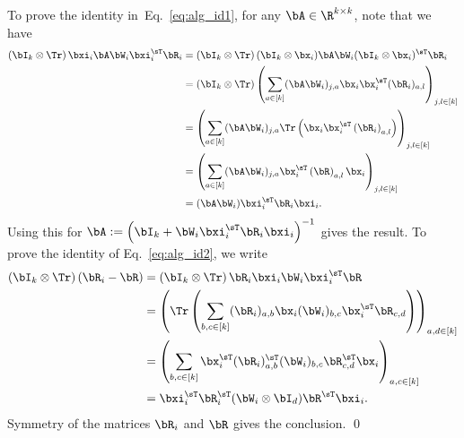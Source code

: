 To prove the identity in~Eq.~\eqref{eq:alg_id1},
for any $\bA \in\R^{k\times k}$, note that 
we have
\begin{align*}
\left(\bI_k \otimes \Tr\right) \bxi_i \bA  \bW_i\bxi_i^\sT \bR_i
   &=\left(\bI_k \otimes \Tr\right) (\bI_k \otimes \bx_i)
   \bA  
\bW_i
   (\bI_k \otimes \bx_i)^\sT \bR_i\\
   &= \left(\bI_k \otimes \Tr\right) \left(\sum_{a\in[k]} 
   (\bA \bW_i)_{j,a}
   \bx_i\bx_i^\sT  (\bR_i)_{a,l}
   \right)_{j,l \in[k]}
   \\
   &= \left( \sum_{a \in [k]}
   (\bA \bW_i)_{j,a}
   \Tr\left(\bx_i\bx_i^\sT  \left(\bR_i\right)_{a,l}
   \right)\right)_{j,l \in [k]}\\
   &= \left( \sum_{a \in [k]}
   (\bA \bW_i)_{j,a}
   \bx_i^\sT  \left(\bR\right)_{a,l} \bx_i
   \right)_{j,l \in [k]}\\
   &= 
   (\bA \bW_i)
   \bxi_i^\sT \bR_i\bxi_i.
\end{align*}
Using this for 
    $\bA :=\left( \bI_k + \bW_i\bxi_i^\sT \bR_i \bxi_i\right)^{-1}$
gives the result.
To prove the identity of Eq.~\eqref{eq:alg_id2}, we write
\begin{align*}
   \left(\bI_k \otimes \Tr \right)(\bR_i - \bR) &= \left(\bI_k \otimes \Tr \right)\bR_i \bxi_i \bW_i\bxi_i^\sT \bR\\
   &= \left(\Tr\left( \sum_{b,c \in [k]} (\bR_i)_{a,b} \bx_i(\bW_i)_{b,c}\bx_i^\sT \bR_{c,d}\right)  \right)_{a,d \in [k]}\\
   &= \left( \sum_{b,c \in [k]}  \bx_i^\sT  (\bR_i)_{a,b}^\sT (\bW_i)_{b,c}\bR_{c,d}^\sT \bx_i  \right)_{a,c \in [k]}\\
   &=  \bxi_i^\sT \bR_i^\sT (\bW_i \otimes \bI_d) \bR^\sT \bxi_i.
\end{align*}
Symmetry of the matrices $\bR_i$ and $\bR$ gives the conclusion.
\qed

